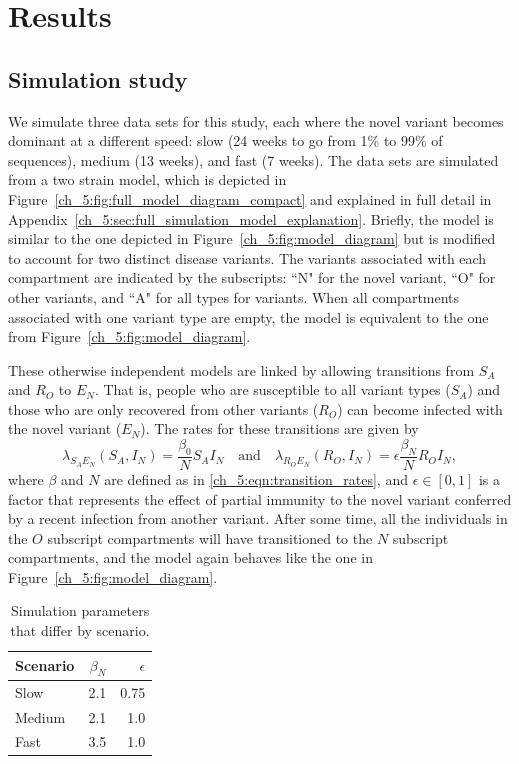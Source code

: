 \section{Results}
\label{ch_5:sec:results}

\subsection{Simulation study}
\label{ch_5:subsec:simulation}

We simulate three data sets for this study, each where the novel variant becomes dominant at a different speed: slow (24 weeks to go from 1\% to 99\% of sequences), medium (13 weeks), and fast (7 weeks).
The data sets are simulated from a two strain model, which is depicted in Figure~\ref{ch_5:fig:full_model_diagram_compact} and explained in full detail in Appendix~\ref{ch_5:sec:full_simulation_model_explanation}.
Briefly, the model is similar to the one depicted in Figure~\ref{ch_5:fig:model_diagram} but is modified to account for two distinct disease variants.
The variants associated with each compartment are indicated by the subscripts: ``N" for the novel variant, ``O" for other variants, and ``A" for all types for variants.
When all compartments associated with one variant type are empty, the model is equivalent to the one from Figure~\ref{ch_5:fig:model_diagram}.

These otherwise independent models are linked by allowing transitions from \( S_A \) and \( R_O \) to \( E_N \).
That is, people who are susceptible to all variant types (\( S_A \)) and those who are only recovered from other variants (\( R_O \)) can become infected with the novel variant (\( E_N \)).
The rates for these transitions are given by
\begin{equation}
   \lambda_{{S_A}{E_N}}\left( S_A, I_N \right) = \frac{\beta_0}{N} S_A I_N \quad \textrm{and} \quad \lambda_{{R_O}{E_N}}\left( R_O, I_N \right) = \epsilon \frac{\beta_N}{N} R_O I_N,
\end{equation}
where \( \beta \) and \( N \) are defined as in \eqref{ch_5:eqn:transition_rates}, and \( \epsilon \in [0, 1] \) is a factor that represents the effect of partial immunity to the novel variant conferred by a recent infection from  another variant.
After some time, all the individuals in the \( O \) subscript compartments will have transitioned to the \( N \) subscript compartments, and the model again behaves like the one in Figure~\ref{ch_5:fig:model_diagram}.

\begin{table}
\caption{Simulation parameters that differ by scenario.}
\label{ch_5:table:scenario_differing_parameters}
\centering
\label{table}
\begin{tabular}{lrr}
Scenario & \( \beta_N \) & \( \epsilon \) \\ \hline
Slow     & 2.1         & 0.75           \\
Medium   & 2.1         & 1.0            \\
Fast     & 3.5         & 1.0            \\
\end{tabular}
\end{table}

